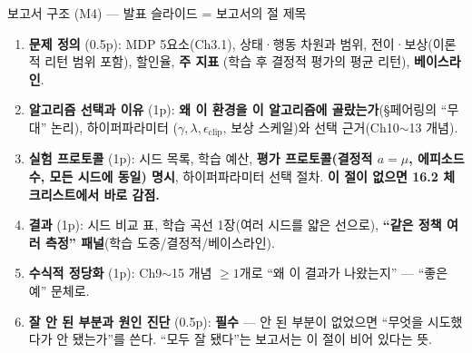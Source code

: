 \documentclass[aspectratio=169,11pt]{beamer}
\begin{document}
\begin{frame}{보고서 구조 (M4) — 발표 슬라이드 = 보고서의 절 제목}
  \small
  \begin{enumerate}
    \item \textbf{문제 정의} (0.5p): MDP 5요소(Ch3.1), 상태·행동 차원과
      범위, 전이·보상(이론적 리턴 범위 포함), 할인율, \textbf{주 지표}
      (학습 후 결정적 평가의 평균 리턴), \textbf{베이스라인}.
    \item \textbf{알고리즘 선택과 이유} (1p): \textbf{왜 이 환경을 이
      알고리즘에 골랐는가}(§페어링의 ``무대'' 논리), 하이퍼파라미터
      ($\gamma, \lambda, \epsilon_{\text{clip}}$, 보상 스케일)와 선택
      근거(Ch10$\sim$13 개념).
    \item \textbf{실험 프로토콜} (1p): 시드 목록, 학습 예산,
      \textbf{평가 프로토콜(결정적 $a=\mu$, 에피소드 수, 모든 시드에 동일)
      명시}, 하이퍼파라미터 선택 절차. \textbf{이 절이 없으면 16.2
      체크리스트에서 바로 감점.}
    \item \textbf{결과} (1p): 시드 비교 표, 학습 곡선 1장(여러 시드를
      얇은 선으로), \textbf{``같은 정책 여러 측정'' 패널}(학습
      도중/결정적/베이스라인).
    \item \textbf{수식적 정당화} (1p): Ch9$\sim$15 개념 $\geq 1$개로
      ``왜 이 결과가 나왔는지'' — ``좋은 예'' 문체로.
    \item \textbf{잘 안 된 부분과 원인 진단} (0.5p): \textbf{필수} —
      안 된 부분이 없었으면 ``무엇을 시도했다가 안 됐는가''를 쓴다.
      ``모두 잘 됐다''는 보고서는 이 절이 비어 있다는 뜻.
  \end{enumerate}
\end{frame}
\end{document}
